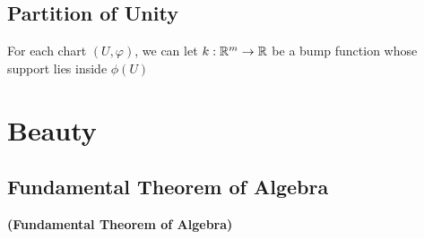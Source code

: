 \documentclass{report}
\begin{document}
\section{Partition of Unity}
\begin{mdframed}
For each chart $(U,\varphi)$, we can let $k:\mathbb{R}^m\rightarrow \mathbb{R}$ be a bump function whose support lies inside $\phi(U)$
\end{mdframed}
\chapter{Beauty}
\section{Fundamental Theorem of Algebra}
\begin{theorem}
\textbf{(Fundamental Theorem of Algebra)}
\end{theorem}
\end{document}
